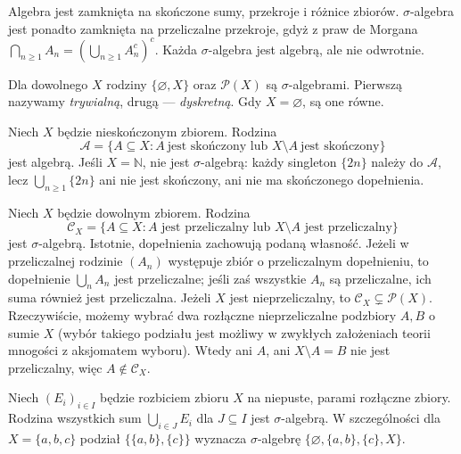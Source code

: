 \begin{uwaga}
Algebra jest zamknięta na skończone sumy, przekroje i różnice zbiorów.
$\sigma$-algebra jest ponadto zamknięta na przeliczalne przekroje, gdyż
z praw de Morgana
$\bigcap_{n\geq1}A_n=(\bigcup_{n\geq1}A_n^c)^c$.
Każda $\sigma$-algebra jest algebrą, ale nie odwrotnie.
\end{uwaga}

\begin{przyklad}
Dla dowolnego $X$ rodziny $\{\varnothing,X\}$ oraz $\mathcal P(X)$ są
$\sigma$-algebrami. Pierwszą nazywamy \emph{trywialną}, drugą ---
\emph{dyskretną}. Gdy $X=\varnothing$, są one równe.
\end{przyklad}

\begin{przyklad}
\label{ex:finite-cofinite}
Niech $X$ będzie nieskończonym zbiorem. Rodzina
\[
\mathcal A=\{A\subseteq X:A\ \text{jest skończony lub }X\setminus A
\ \text{jest skończony}\}
\]
jest algebrą. Jeśli $X=\mathbb N$, nie jest $\sigma$-algebrą:
każdy singleton $\{2n\}$ należy do $\mathcal A$, lecz
$\bigcup_{n\geq1}\{2n\}$ ani nie jest skończony, ani nie ma skończonego
dopełnienia.
\end{przyklad}

\begin{przyklad}
\label{ex:countable-cocountable}
Niech $X$ będzie dowolnym zbiorem. Rodzina
\[
\mathcal C_X=\{A\subseteq X:A\text{ jest przeliczalny lub }X\setminus A
\text{ jest przeliczalny}\}
\]
jest $\sigma$-algebrą. Istotnie, dopełnienia zachowują podaną własność.
Jeżeli w przeliczalnej rodzinie $(A_n)$ występuje zbiór o przeliczalnym
dopełnieniu, to dopełnienie $\bigcup_nA_n$ jest przeliczalne; jeśli zaś
wszystkie $A_n$ są przeliczalne, ich suma również jest przeliczalna.
Jeżeli $X$ jest nieprzeliczalny, to $\mathcal C_X\subsetneq\mathcal P(X)$.
Rzeczywiście, możemy wybrać dwa rozłączne nieprzeliczalne podzbiory
$A,B$ o sumie $X$ (wybór takiego podziału jest możliwy w zwykłych
założeniach teorii mnogości z aksjomatem wyboru). Wtedy ani $A$,
ani $X\setminus A=B$ nie jest przeliczalny, więc
$A\notin\mathcal C_X$.
\end{przyklad}

\begin{przyklad}
Niech $(E_i)_{i\in I}$ będzie rozbiciem zbioru $X$ na niepuste, parami
rozłączne zbiory. Rodzina wszystkich sum $\bigcup_{i\in J}E_i$ dla
$J\subseteq I$ jest $\sigma$-algebrą. W szczególności dla
$X=\{a,b,c\}$ podział $\{\{a,b\},\{c\}\}$ wyznacza $\sigma$-algebrę
$\{\varnothing,\{a,b\},\{c\},X\}$.
\end{przyklad}

